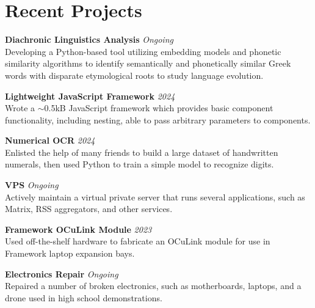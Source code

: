 \documentclass[11pt]{article}
\begin{document}
\section*{Recent Projects}

\textbf{Diachronic Linguistics Analysis} \hfill \textit{Ongoing} \\
Developing a Python-based tool utilizing embedding models and phonetic similarity algorithms to identify semantically and phonetically similar Greek words with disparate etymological roots to study language evolution.

\vspace{1.5ex}

\textbf{Lightweight JavaScript Framework} \hfill \textit{2024} \\
Wrote a $\sim$0.5kB JavaScript framework which provides basic component functionality, including nesting, able to pass arbitrary parameters to components.

\vspace{1.5ex}

\textbf{Numerical OCR} \hfill \textit{2024} \\
Enlisted the help of many friends to build a large dataset of handwritten numerals, then used Python to train a simple model to recognize digits. 

\vspace{1.5ex}

\textbf{VPS} \hfill \textit{Ongoing} \\
Actively maintain a virtual private server that runs several applications, such as Matrix, RSS aggregators, and other services.

\vspace{1.5ex}

\textbf{Framework OCuLink Module} \hfill \textit{2023} \\
Used off-the-shelf hardware to fabricate an OCuLink module for use in Framework laptop expansion bays. 

\vspace{1.5ex}

\textbf{Electronics Repair} \hfill \textit{Ongoing} \\
Repaired a number of broken electronics, such as motherboards, laptops, and a drone used in high school demonstrations. 
\end{document}
